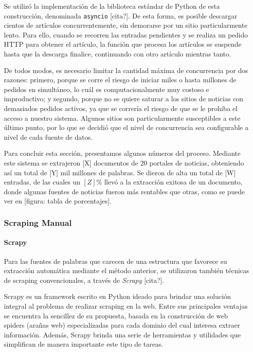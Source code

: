 Se utilizó la implementación de la biblioteca estándar de Python de esta construcción, denominada
\texttt{asyncio} [cita?]. De esta forma, es posible descargar cientos de artículos concurrentemente,
sin demorarse por un sitio particularmente lento. Para ello, cuando se recorren las entradas
pendientes y se realiza un pedido HTTP para obtener el artículo, la función que procesa los
artículos se suspende hasta que la descarga finalice, continuando con otro artículo mientras tanto.

De todos modos, es necesario limitar la cantidad máxima de concurrencia por dos razones: primero,
porque se corre el riesgo de iniciar miles o hasta millones de pedidos en simultáneo, lo cuál es
computacionalmente muy costoso e improductivo; y segundo, porque no se quiere saturar a los sitios
de noticias con demasiados pedidos activos, ya que se correría el riesgo de que se le prohiba el
acceso a nuestro sistema. Algunos sitios son particularmente susceptibles a este último punto, por
lo que se decidió que el nivel de concurrencia sea configurable a nivel de cada fuente de datos.


Para concluir esta sección, presentamos algunos números del proceso. Mediante este sistema se
extrajeron [X] documentos de 20 portales de noticias, obteniendo así un total de [Y] mil millones de
palabras. Se dieron de alta un total de [W] entradas, de las cuales un $[Z]\%$ llevó a la extracción
exitosa de un documento, donde algunas fuentes de noticias fueron más rentables que otras, como se
puede ver en [figura: tabla de porcentajes].


\subsubsection{Scraping Manual}

\paragraph{Scrapy}

Para las fuentes de palabras que carecen de una estructura que favorece su extracción automática
mediante el método anterior, se utilizaron también técnicas de scraping convencionales, a través de
\textit{Scrapy} [cita?].

Scrapy es un framework escrito en Python ideado para brindar una solución integral al problema de
realizar scraping en la web. Entre sus principales ventajas se encuentra la sencillez de su
propuesta, basada en la construcción de web spiders (arañas web) especializadas para cada dominio
del cual interesa extraer información. Además, Scrapy brinda una serie de herramientas y utilidades
que simplifican de manera importante este tipo de tareas.

